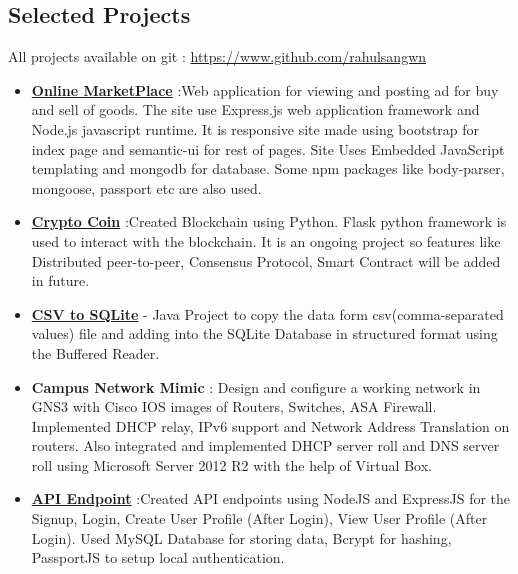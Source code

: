 \documentclass[margin, centered]{res}
\begin{document}
\begin{resume}
\section{Selected Projects}
All projects available on git : \url{https://www.github.com/rahulsangwn}
\begin{itemize}[leftmargin=*]
 \item \textbf{\href{https://github.com/rahulsangwn/OnlineMarketPlace}{Online MarketPlace}} :Web application for viewing and posting ad for buy and sell of goods. The site use Express.js web application framework and Node.js javascript runtime. It is responsive site made using bootstrap for index page and semantic-ui for rest of pages. Site Uses Embedded JavaScript templating and mongodb for database. Some npm packages like body-parser, mongoose, passport etc are also used.
 \item \textbf{\href{https://github.com/rahulsangwn/Crptro-Coin}{Crypto Coin}} :Created Blockchain using Python. Flask python framework is used to interact with the blockchain. It is an ongoing project so features like Distributed peer-to-peer, Consensus Protocol, Smart Contract will be added in future.
 \item \textbf{\href{https://github.com/rahulsangwn/CSVtoSQLite}{CSV to SQLite}} - Java Project to copy the data form csv(comma-separated values) file and adding into the SQLite Database in structured format using the Buffered Reader.
 \item \textbf{Campus Network Mimic} : Design and configure a working network in GNS3 with Cisco IOS images of Routers, Switches, ASA Firewall. Implemented DHCP relay, IPv6 support and Network Address Translation on routers. Also integrated and implemented DHCP server roll and DNS server roll using Microsoft Server 2012 R2 with the help of Virtual Box.
 \item \textbf{\href{https://github.com/rahulsangwn/API-Endpoints}{API Endpoint}} :Created API endpoints using NodeJS and ExpressJS  for the Signup, Login, Create User Profile (After Login), View User Profile (After Login). Used MySQL Database for storing data, Bcrypt for hashing, PassportJS to setup local authentication.

\end{itemize}
\vspace{3mm}




\end{resume}
\end{document}
